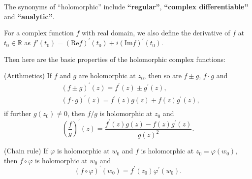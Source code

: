 \documentclass{article}
\begin{document}
\begin{Rmk}{}
    \begin{compactenum}
        \item \textcolor{Df}{The synonyms of ``holomorphic'' include \textbf{``regular''}, \textbf{``complex differentiable''} and \textbf{``analytic''}.}
        \item \textcolor{Df}{For a complex function $f$ with real domain, we also define the derivative of $f$ at $t_0\in\mathbb{R}$ as $f'(t_0) = (\text{Re}f)^\prime(t_0) + i(\text{Im}f)^\prime(t_0)$.}
    \end{compactenum}
    Then here are the basic properties of the holomorphic complex functions: \textcolor{Th}{
    \begin{compactenum}
        \item (Arithmetics) If $f$ and $g$ are holomorphic at $z_0$, then so are $f\pm g$, $f\cdot g$ and
        $$ \begin{aligned}
            & (f \pm g)^\prime(z) = f^\prime(z) \pm g^\prime(z),\\
            & (f\cdot g)^\prime(z) = f^\prime(z)g(z) + f(z)g^\prime(z),\\
        \end{aligned} $$
        if further $g(z_0)\neq 0$, then $f/g$ is holomorphic at $z_0$ and 
        $$ \left(\frac{f}{g}\right)^\prime(z) = \frac{f^\prime(z)g(z) - f(z)g^\prime(z)}{g(z)^2}. $$
        \item (Chain rule) If $\varphi$ is holomorphic at $w_0$ and $f$ is holomorphic at $z_0 = \varphi(w_0)$, then $f\circ\varphi$ is holomorphic at $w_0$ and
        $$ (f\circ\varphi)^\prime(w_0) = f^\prime(z_0)\varphi^\prime(w_0). $$
    \end{compactenum}}
\end{Rmk}
\end{document}
